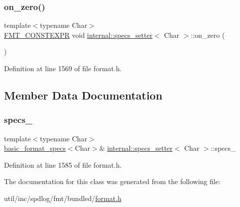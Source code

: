 \subsubsection{\texorpdfstring{on\+\_\+zero()}{on\_zero()}}
{\footnotesize\ttfamily template$<$typename Char$>$ \\
\hyperlink{core_8h_a69201cb276383873487bf68b4ef8b4cd}{F\+M\+T\+\_\+\+C\+O\+N\+S\+T\+E\+X\+PR} void \hyperlink{classinternal_1_1specs__setter}{internal\+::specs\+\_\+setter}$<$ Char $>$\+::on\+\_\+zero (\begin{DoxyParamCaption}{ }\end{DoxyParamCaption})\hspace{0.3cm}{\ttfamily [inline]}}



Definition at line 1569 of file format.\+h.



\subsection{Member Data Documentation}
\mbox{\label{classinternal_1_1specs__setter_a340e1b2d94403a8f91e741fd9a5bc97a}} 
\subsubsection{\texorpdfstring{specs\+\_\+}{specs\_}}
{\footnotesize\ttfamily template$<$typename Char$>$ \\
\hyperlink{structbasic__format__specs}{basic\+\_\+format\+\_\+specs}$<$Char$>$\& \hyperlink{classinternal_1_1specs__setter}{internal\+::specs\+\_\+setter}$<$ Char $>$\+::specs\+\_\+\hspace{0.3cm}{\ttfamily [protected]}}



Definition at line 1585 of file format.\+h.



The documentation for this class was generated from the following file\+:\begin{DoxyCompactItemize}
\item 
util/inc/spdlog/fmt/bundled/\hyperlink{format_8h}{format.\+h}\end{DoxyCompactItemize}
